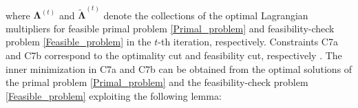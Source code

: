 \documentclass[12pt, draftclsnofoot, onecolumn]{IEEEtran}
\DeclareMathOperator{\mino}{minimize}
\begin{document}
\begin{eqnarray}
\end{eqnarray}
where $\bm{\Lambda}^{(t)}$ and $\widetilde{\bm{\Lambda}}^{(t)}$ denote the collections of the optimal Lagrangian multipliers for feasible primal problem \eqref{Primal_problem} and feasibility-check problem \eqref{Feasible_problem} in the $t$-th iteration, respectively. Constraints C7a and C7b correspond to the optimality cut and feasibility cut, respectively \cite{geoffrion1972generalized}. The inner minimization in C7a and C7b can be obtained from the optimal solutions of the primal problem \eqref{Primal_problem} and the feasibility-check problem \eqref{Feasible_problem} exploiting the following lemma:
\end{document}
